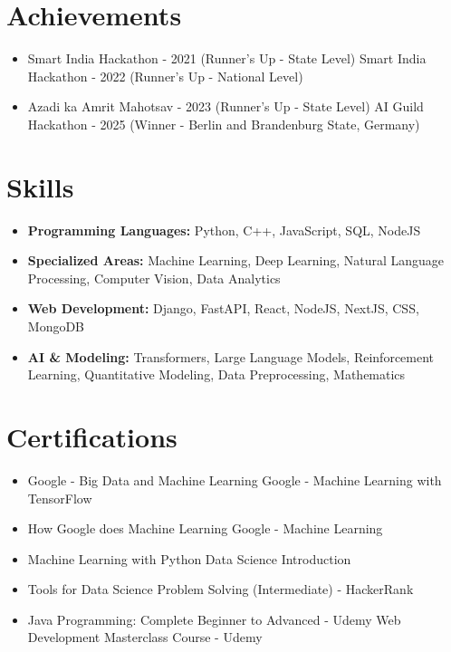 \documentclass[a4paper,10pt]{article}
\begin{document}
\section*{Achievements}
\begin{itemize}
\item Smart India Hackathon - 2021 (Runner's Up - State Level) \hfill Smart India Hackathon - 2022 (Runner's Up - National Level)
\item Azadi ka Amrit Mahotsav - 2023 (Runner's Up - State Level) \hfill AI Guild Hackathon - 2025 (Winner - Berlin and Brandenburg State, Germany)
\end{itemize}

\section*{Skills}
\begin{itemize}
  \item \textbf{Programming Languages:} Python, C++, JavaScript, SQL, NodeJS
  \item \textbf{Specialized Areas:} Machine Learning, Deep Learning, Natural Language Processing, Computer Vision, Data Analytics
  \item \textbf{Web Development:} Django, FastAPI, React, NodeJS, NextJS, CSS, MongoDB
  \item \textbf{AI \& Modeling:} Transformers, Large Language Models, Reinforcement Learning, Quantitative Modeling, Data Preprocessing, Mathematics
\end{itemize}

\section*{Certifications}
\begin{itemize}
\item Google - Big Data and Machine Learning \hfill Google - Machine Learning with TensorFlow
\item How Google does Machine Learning \hfill Google - Machine Learning
\item Machine Learning with Python \hfill Data Science Introduction
\item Tools for Data Science \hfill Problem Solving (Intermediate) - HackerRank
\item Java Programming: Complete Beginner to Advanced - Udemy \hfill Web Development Masterclass Course - Udemy
\end{itemize}
\end{document}
